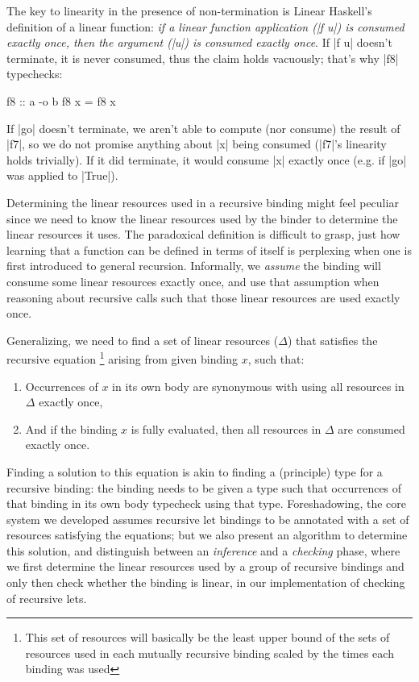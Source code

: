 \documentclass[acmsmall, screen, review]{acmart}
\begin{document}
%
The key to linearity in the presence of non-termination is Linear Haskell's
definition of a linear function: \emph{if a linear function application (|f u|) is
consumed exactly once, then the argument (|u|) is consumed exactly once}.
If |f u| doesn't terminate, it is never consumed, thus the claim holds
vacuously; that's why |f8| typechecks:
\begin{working}
\begin{code}
f8 :: a -o b
f8 x = f8 x
\end{code}
\end{working}
%
If |go| doesn't terminate, we aren't able to compute (nor consume) the result
of |f7|, so we do not promise anything about |x| being consumed (|f7|'s
linearity holds trivially). If it did terminate, it would consume |x| exactly
once (e.g. if |go| was applied to |True|).

Determining the linear resources used in a recursive binding might feel
peculiar since we need to know the linear resources used by the binder to determine the linear resources it uses.
%
The paradoxical definition is difficult to grasp, just how learning that a
function can be defined in terms of itself is perplexing when one is first
introduced to general recursion.
%
Informally, we \emph{assume} the binding will consume some linear resources
exactly once, and use that assumption when reasoning about recursive calls such
that those linear resources are used exactly once.


Generalizing, we need to find a set of linear resources ($\Delta$) that satisfies the recursive equation
\footnote{This set of resources will basically be the least upper bound of the sets of resources used in each
mutually recursive binding scaled by the times each binding was used}
arising from given binding $x$, such that:
\begin{enumerate}
\item Occurrences of $x$ in its own body are synonymous with using all resources in $\Delta$ exactly once,
\item And if the binding $x$ is fully evaluated, then all resources in $\Delta$ are consumed exactly once.
\end{enumerate}
Finding a solution to this equation is akin to finding a (principle) type for a
recursive binding: the binding needs to be given a type such that occurrences of
that binding in its own body typecheck using that type.
%
Foreshadowing, the core system we developed assumes recursive let bindings to
be annotated with a set of resources satisfying the equations; but we also
present an algorithm to determine this solution, and distinguish between an
\emph{inference} and a \emph{checking} phase, where we first determine the
linear resources used by a group of recursive bindings and only then check
whether the binding is linear, in our implementation of checking of recursive
lets.
\end{document}

